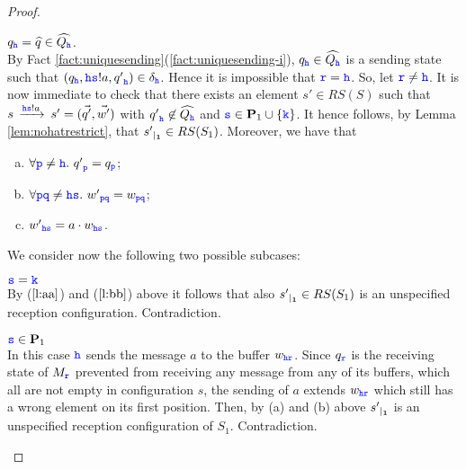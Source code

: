 \begin{proof}
\begin{description}
\item 
${q}_\HH=\widehat{q}\in \widehat{Q_\HH}$.\\ 
By Fact \ref{fact:uniquesending}(\ref{fact:uniquesending-i}),
${q}_\HH\in \widehat{Q_\HH}$ is a sending state such that $({q}_\HH,\HH\tts!a,{q'}_\HH)\in{\delta}_\HH$. Hence it is impossible that $\ttr=\HH$.
So, let $\ttr\neq\HH$.
It is now immediate to check that  there exists an element $s'\in RS(S)$ such that
$s\lts{\HH\tts!a}s'=(\vec{q'},\vec{w'})$ with ${q'}_\HH\not\in \widehat{Q_\HH}$
and $\tts \in \roles_1 \cup \Set{\KK}$.
It hence follows, by Lemma \ref{lem:nohatrestrict}, that $\restrict{s'}{1} \in RS(S_1)$.
Moreover, we have that 
\begin{enumerate}[a)]
\item
\label{l:aa}
$\forall \ttp\neq\HH.\ {q'}_\ttp = {q}_\ttp$;
\item
\label{l:bb}
$\forall \ttp\ttq \neq \HH\tts.\ {w'}_{\ttp\ttq} = {w}_{\ttp\ttq}$;
\item
\label{l:cc}
${w'}_{\HH\tts} = a\cdot{w}_{\HH\tts}$.
\end{enumerate}
We consider now the following two possible subcases:
\begin{description}
\item
$\tts = \KK$\\
By ($\ref{l:aa}$) and ($\ref{l:bb}$) above it follows that  also $\restrict{s'}{1} \in RS(S_1)$ is an unspecified reception configuration. Contradiction.
\item
$\tts \in \roles_1$\\
In this case $\HH$ sends the message $a$ to the buffer $w_{\HH\ttr}$. Since $q_\ttr$ is the receiving state of $M_\ttr$ prevented from receiving any message from any of its buffers, which all are not empty in configuration $s$, the sending of $a$ extends $w_{\HH\ttr}$ which still has a wrong element on its first position. Then, by (a) and (b) above $\restrict{s'}{1}$ is an unspecified reception configuration of $S_1$.  Contradiction.



\end{description}
\end{description}
\end{proof}
